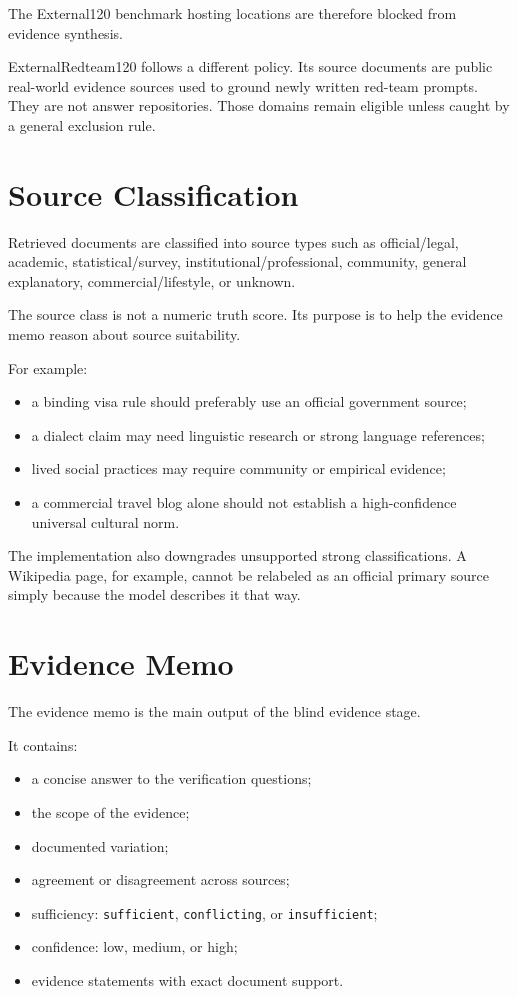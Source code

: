 The External120 benchmark hosting locations are therefore blocked from evidence synthesis.

ExternalRedteam120 follows a different policy. Its source documents are public real-world evidence sources used to ground newly written red-team prompts. They are not answer repositories. Those domains remain eligible unless caught by a general exclusion rule.

\section{Source Classification}

Retrieved documents are classified into source types such as official/legal, academic, statistical/survey, institutional/professional, community, general explanatory, commercial/lifestyle, or unknown.

The source class is not a numeric truth score. Its purpose is to help the evidence memo reason about source suitability.

For example:

\begin{itemize}
\item a binding visa rule should preferably use an official government source;
\item a dialect claim may need linguistic research or strong language references;
\item lived social practices may require community or empirical evidence;
\item a commercial travel blog alone should not establish a high-confidence universal cultural norm.
\end{itemize}

The implementation also downgrades unsupported strong classifications. A Wikipedia page, for example, cannot be relabeled as an official primary source simply because the model describes it that way.

\section{Evidence Memo}

The evidence memo is the main output of the blind evidence stage.

It contains:

\begin{itemize}
\item a concise answer to the verification questions;
\item the scope of the evidence;
\item documented variation;
\item agreement or disagreement across sources;
\item sufficiency: \texttt{sufficient}, \texttt{conflicting}, or \texttt{insufficient};
\item confidence: low, medium, or high;
\item evidence statements with exact document support.
\end{itemize}

